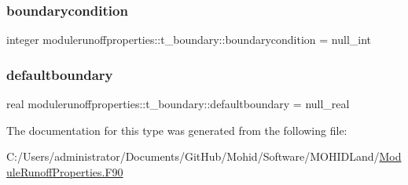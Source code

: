 \subsubsection{\texorpdfstring{boundarycondition}{boundarycondition}}
{\footnotesize\ttfamily integer modulerunoffproperties\+::t\+\_\+boundary\+::boundarycondition = null\+\_\+int\hspace{0.3cm}{\ttfamily [private]}}

\mbox{\label{structmodulerunoffproperties_1_1t__boundary_a512fd7ce237fd1696a73e6ac170a53e7}} 
\subsubsection{\texorpdfstring{defaultboundary}{defaultboundary}}
{\footnotesize\ttfamily real modulerunoffproperties\+::t\+\_\+boundary\+::defaultboundary = null\+\_\+real\hspace{0.3cm}{\ttfamily [private]}}



The documentation for this type was generated from the following file\+:\begin{DoxyCompactItemize}
\item 
C\+:/\+Users/administrator/\+Documents/\+Git\+Hub/\+Mohid/\+Software/\+M\+O\+H\+I\+D\+Land/\mbox{\hyperlink{_module_runoff_properties_8_f90}{Module\+Runoff\+Properties.\+F90}}\end{DoxyCompactItemize}
